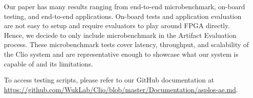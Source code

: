 Our paper has many results ranging from end-to-end microbenchmark, on-board testing, and end-to-end applications. On-board tests and application evaluation are not easy to setup and require evaluators to play around FPGA directly. Hence, we deciede to only include microbenchmark in the Artifact Evaluation process. These microbenchmark tests cover latency, throughput, and scalability of the Clio system and are representative enough to showcase what our system is capable of and its limitations.

To access testing scripts, please refer to our GitHub documentation at \url{https://github.com/WukLab/Clio/blob/master/Documentation/asplos-ae.md}.



\newpage
